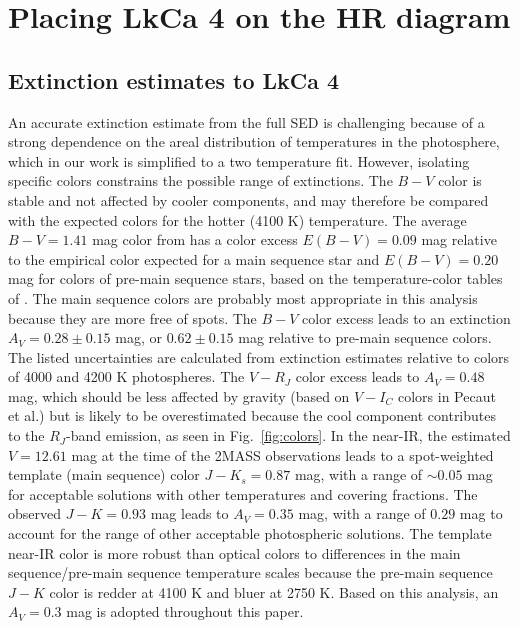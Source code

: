 \documentclass[twocolumn]{emulateapj}%
\begin{document}
\section{Placing LkCa 4 on the HR diagram}


\subsection{Extinction estimates to LkCa 4}

An accurate extinction estimate from the full SED is challenging because of a strong dependence on the areal distribution of temperatures in the photosphere, which in our work is simplified to a two temperature fit.  However, isolating specific colors constrains the possible range of extinctions.  
The $B-V$ color is stable and not affected by cooler components, and may therefore be compared with the expected colors for the hotter (4100 K) temperature.  
The average $B-V=1.41$ mag color from \citet{grankin08} has a color excess $E(B-V)=0.09$ mag relative to the empirical color expected for a main sequence star and $E(B-V)=0.20$ mag for colors of pre-main sequence stars, based on the temperature-color tables of \citep{pecaut13}.  The main sequence colors are probably most 
appropriate in this analysis because they are more free of spots.  
The $B-V$ color 
excess leads to an extinction $A_V=0.28\pm0.15$ mag, or $0.62\pm0.15$ mag relative to 
pre-main sequence colors.   The listed uncertainties are calculated from extinction estimates relative to colors of 4000 and 4200 K photospheres.
The $V-R_J$ color excess leads to $A_V=0.48$ mag, which should be less affected by gravity (based on $V-I_C$ colors in Pecaut et al.) but is likely to be overestimated because the cool component contributes to the $R_J$-band emission, as seen in Fig.~\ref{fig:colors}.
In the near-IR, the estimated $V=12.61$ mag at the time of the 2MASS observations leads to a spot-weighted template (main sequence) color 
$J-K_s=0.87$ mag, with a range of $\sim 0.05$ mag for acceptable solutions with other 
temperatures and covering fractions. The observed $J-K=0.93$ mag leads to $A_V=0.35$ mag, 
with a range of $0.29$ mag to account for the range of other acceptable photospheric solutions.  
The template near-IR color is more robust than optical colors to differences 
in the main sequence/pre-main sequence temperature scales because the pre-main 
sequence $J-K$ color is redder at 4100 K and bluer at 2750 K.  Based on this 
analysis, an $A_V=0.3$ mag is adopted throughout this paper. 
\end{document}
